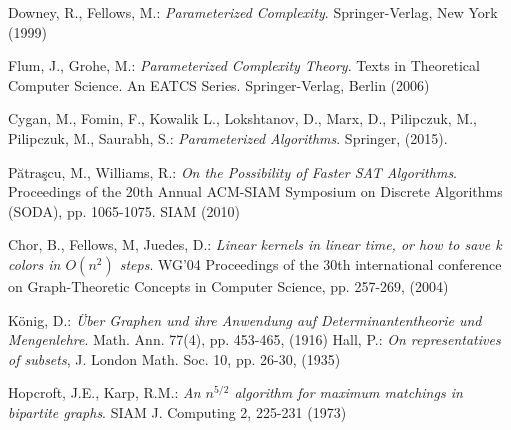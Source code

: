 \documentclass[en]{pracamgr}
\theoremstyle{definition}
\begin{document}
\begin{thebibliography}{99}

  Downey, R., Fellows, M.: \textit{Parameterized Complexity}. Springer-Verlag, New York (1999)


 Flum, J., Grohe, M.: \textit{Parameterized Complexity Theory}. Texts in Theoretical Computer Science. An EATCS Series. Springer-Verlag, Berlin (2006)

 Cygan, M., Fomin, F., Kowalik L., Lokshtanov, D., Marx, D., Pilipczuk, M., Pilipczuk, M., Saurabh, S.: \textit{Parameterized Algorithms}. Springer, (2015).

 Pătraşcu, M., Williams, R.: \textit{On the Possibility of Faster SAT Algorithms}. Proceedings of the 20th Annual ACM-SIAM Symposium on Discrete Algorithms (SODA), pp. 1065-1075. SIAM (2010)

 Chor, B., Fellows, M, Juedes, D.: \textit{Linear kernels in linear time, or how to save k colors in $O(n^2)$ steps}. WG'04 Proceedings of the 30th international conference on Graph-Theoretic Concepts in Computer Science, pp. 257-269, (2004)

 König, D.: \textit{Über Graphen und ihre Anwendung auf Determinantentheorie und Mengenlehre}. Math. Ann. 77(4), pp. 453-465, (1916)
 Hall, P.: \textit{On representatives of subsets}, J. London Math. Soc. 10, pp. 26-30, (1935)

 Hopcroft, J.E., Karp, R.M.: \textit{An $n^{5/2}$ algorithm for maximum matchings in bipartite graphs}. SIAM J. Computing 2, 225-231 (1973)



\end{thebibliography}
\end{document}
